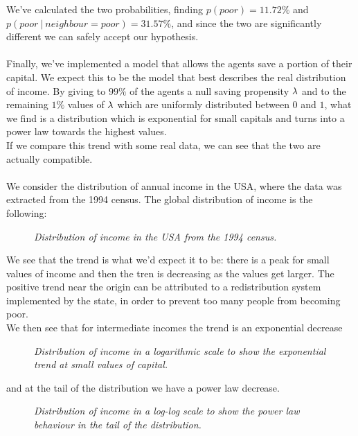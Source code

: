 We've calculated the two probabilities, finding $p(poor) = 11.72 \%$ and $p(poor \ | \ neighbour=poor) = 31.57 \%$, and since the two are significantly different we can safely accept our hypothesis. \\ \\
Finally, we've implemented a model that allows the agents save a portion of their capital. We expect this to be the model that best describes the real distribution of income. By giving to $99 \%$ of the agents a null saving propensity $\lambda$ and to the remaining $1 \%$ values of $\lambda$ which are uniformly distributed between $0$ and $1$, what we find is a distribution which is exponential for small capitals and turns into a power law towards the highest values. \\
If we compare this trend with some real data, we can see that the two are actually compatible. \\ \\
We consider the distribution of annual income in the USA, where the data was extracted from the 1994 census. The global distribution of income is the following:
\begin{figure}[ht!]
    \centering
    \scalebox{.7}{}
    \caption{\emph{Distribution of income in the USA from the 1994 census.}}
    \label{fig:gloabl_realData}
\end{figure}
We see that the trend is what we'd expect it to be: there is a peak for small values of income and then the tren is decreasing as the values get larger. The positive trend near the origin can be attributed to a redistribution system implemented by the state, in order to prevent too many people from becoming poor. \\
We then see that for intermediate incomes the trend is an exponential decrease
\begin{figure}[ht!]
    \centering
    \scalebox{.7}{}
    \caption{\emph{Distribution of income in a logarithmic scale to show the exponential trend at small values of capital.}}
    \label{fig:real_head}
\end{figure}
 and at the tail of the distribution we have a power law decrease.
\begin{figure}[ht!]
    \centering
    \scalebox{.7}{}
    \caption{\emph{Distribution of income in a log-log scale to show the power law behaviour in the tail of the distribution.}}
    \label{fig:real_tail}
\end{figure}
